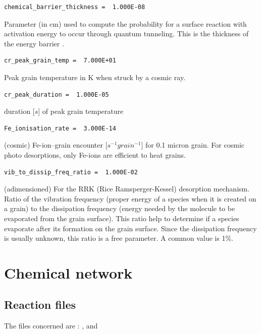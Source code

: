 \documentclass[english,a4paper,twoside]{article}
\begin{document}
\begin{verbatim}
chemical_barrier_thickness =  1.000E-08
\end{verbatim}
Parameter (in cm) used to compute the probability for a surface reaction with activation energy to occur through quantum tunneling. This is the thickness of the energy barrier \citep[See equation 6]{1992ApJS...82..167H}.

\begin{verbatim}
cr_peak_grain_temp =  7.000E+01
\end{verbatim}
Peak grain temperature in K when struck by a cosmic ray.

\begin{verbatim}
cr_peak_duration =  1.000E-05
\end{verbatim}
duration [$\unit{s}$] of peak grain temperature

\begin{verbatim}
Fe_ionisation_rate =  3.000E-14
\end{verbatim}
(cosmic) Fe-ion--grain encounter [$\unit{s^{-1} grain^{-1}}$] for 0.1 micron grain. For cosmic photo desorptions, only Fe-ions are efficient to heat grains. 

\begin{verbatim}
vib_to_dissip_freq_ratio =  1.000E-02
\end{verbatim}
(adimensioned) For the RRK (Rice Ramsperger-Kessel) desorption mechanism. Ratio of the vibration frequency (proper energy of a species when it is created on a grain) to the dissipation frequency (energy needed by the molecule to be evaporated from the grain surface). This ratio help to determine if a species evaporate after its formation on the grain surface. Since the dissipation frequency is usually unknown, this ratio is a free parameter. A common value is 1\%.

\section{Chemical network}
\subsection{Reaction files}
The files concerned are : ,  and 
\end{document}
